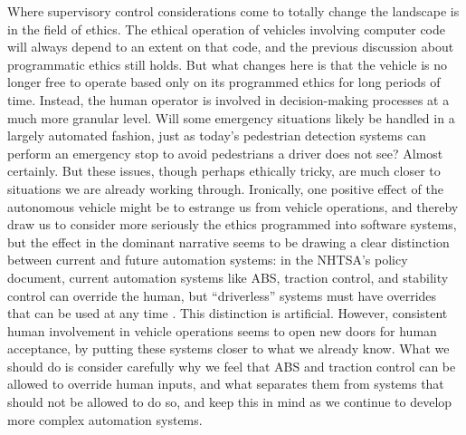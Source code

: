 Where supervisory control considerations come to totally change
the landscape is in the field of ethics. The ethical operation of
vehicles involving computer code will always depend to an extent on
that code, and the previous discussion about programmatic ethics still
holds. But what changes here is that the vehicle is no longer free to
operate based only on its programmed ethics for long periods of time.
Instead, the human operator is involved in decision-making processes
at a much more granular level. Will some emergency situations likely
be handled in a largely automated fashion, just as today's pedestrian
detection systems can perform an emergency stop to avoid pedestrians a
driver does not see? Almost certainly. But these issues, though
perhaps ethically tricky, are much closer to situations we are already
working through. Ironically, one positive effect of the autonomous vehicle
might be to estrange us from vehicle operations, and thereby draw us
to consider more seriously the ethics programmed into software
systems, but the effect in the dominant narrative seems to be drawing a
clear distinction between current and future automation systems:  in
the NHTSA's policy document, current automation systems like ABS,
traction control, and stability control can override the human, but
``driverless'' systems must have overrides that can be used at any
time \cite[p. 13]{NHTSA}. This distinction is artificial. However,
consistent human involvement in vehicle operations seems to open new
doors for human acceptance, by putting these systems closer to what we
already know. What we should do is consider carefully why we feel that
ABS and traction control can be allowed to override human inputs, and
what separates them from systems that should not be allowed to do so, and
keep this in mind as we continue to develop more complex automation systems.

